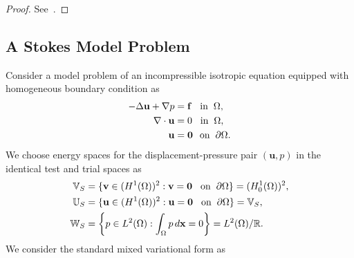 \begin{proof}
		  See~\cite{directSerendipity}.
\end{proof}

\subsection{A Stokes Model Problem}
Consider a model problem of an incompressible isotropic equation equipped with homogeneous 
boundary condition as
\begin{equation}\label{eq:stokesmodel}
		  \begin{aligned}
					 -\Delta \mathbf{u} + \nabla p &= \mathbf{f} \hspace{0.3cm} \text{in} \hspace{0.2cm} \Omega, \\
					 \nabla \cdot \mathbf{u}  &= 0 \hspace{0.3cm} \text{in} \hspace{0.2cm} \Omega,\\
					 \mathbf{u} &= \mathbf{0} \hspace{0.25cm} \text{on} \hspace{0.2cm} \partial \Omega.
		  \end{aligned}
\end{equation}
We choose energy spaces for the displacement-pressure pair $(\mathbf{u},p)$  in 
the identical test and trial spaces as
\begin{equation}
		  \begin{aligned}
					 \mathbb{V}_S &= \{\mathbf{v} \in (H^1(\Omega))^2 : \mathbf{v} = \mathbf{0} \hspace{0.3cm} \text{on} \hspace{0.2cm} \partial \Omega\} = (H^1_0(\Omega))^2, \\
					 \mathbb{U}_S &= \{\mathbf{u} \in (H^1(\Omega))^2 : \mathbf{u} = \mathbf{0} 
					 \hspace{0.3cm} \text{on} \hspace{0.2cm} \partial \Omega\} = \mathbb{V}_S, \\
					 \mathbb{W}_S &= \bigg\{p \in L^2(\Omega) : \int_{\Omega}p\, d\mathbf{x} = 0\bigg\} = L^2(\Omega)/\mathbb{R}.
		  \end{aligned}
\end{equation}
We consider the standard mixed variational form as

